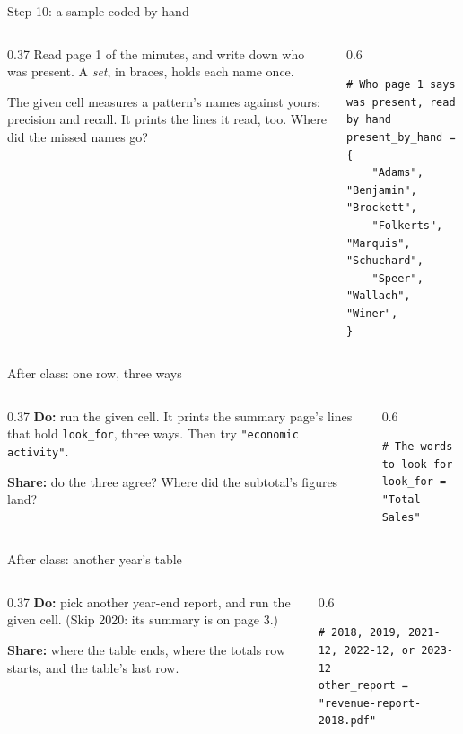 \documentclass[9pt,aspectratio=169]{beamer}
\begin{document}
\begin{frame}[fragile]{Step 10: a sample coded by hand}
    \begin{columns}[T]
        \begin{column}{0.37\textwidth}
            Read page 1 of the minutes, and write down who was present. A \textit{set}, in braces, holds each name once.

            \medskip
            The given cell measures a pattern's names against yours: precision and recall. It prints the lines it read, too. Where did the missed names go?
        \end{column}
        \begin{column}{0.6\textwidth}
\begin{lstlisting}
# Who page 1 says was present, read by hand
present_by_hand = {
    "Adams", "Benjamin", "Brockett",
    "Folkerts", "Marquis", "Schuchard",
    "Speer", "Wallach", "Winer",
}
\end{lstlisting}
        \end{column}
    \end{columns}
\end{frame}

\begin{frame}[fragile]{After class: one row, three ways}
    \begin{columns}[T]
        \begin{column}{0.37\textwidth}
            \textbf{Do:} run the given cell. It prints the summary page's lines that hold \texttt{look\_for}, three ways. Then try \texttt{"economic activity"}.

            \medskip
            \textbf{Share:} do the three agree? Where did the subtotal's figures land?
        \end{column}
        \begin{column}{0.6\textwidth}
\begin{lstlisting}
# The words to look for
look_for = "Total Sales"
\end{lstlisting}
        \end{column}
    \end{columns}
\end{frame}

\begin{frame}[fragile]{After class: another year's table}
    \begin{columns}[T]
        \begin{column}{0.37\textwidth}
            \textbf{Do:} pick another year-end report, and run the given cell. (Skip 2020: its summary is on page 3.)

            \medskip
            \textbf{Share:} where the table ends, where the totals row starts, and the table's last row.
        \end{column}
        \begin{column}{0.6\textwidth}
\begin{lstlisting}
# 2018, 2019, 2021-12, 2022-12, or 2023-12
other_report = "revenue-report-2018.pdf"
\end{lstlisting}
        \end{column}
    \end{columns}
\end{frame}
\end{document}
